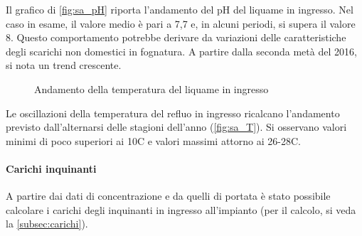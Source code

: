 Il grafico di \autoref{fig:sa_pH} riporta l’andamento del pH del liquame in ingresso.
Nel caso in esame, il valore medio è pari a 7,7 e, in alcuni periodi, si supera il valore 8. Questo comportamento potrebbe derivare da variazioni delle caratteristiche degli scarichi non domestici in fognatura. A partire dalla seconda metà del 2016, si nota un trend crescente.

\begin{figure}
	\fbox{\texttt{[image: sa\_T]}}
	\centering
	\caption{Andamento della temperatura del liquame in ingresso}
	\label{fig:sa_T}
\end{figure}

Le oscillazioni della temperatura del refluo in ingresso ricalcano l’andamento previsto dall’alternarsi delle stagioni dell’anno (\autoref{fig:sa_T}).
Si osservano valori minimi di poco superiori ai 10\textdegree C e valori massimi attorno ai 26-28\textdegree C.

\paragraph{Carichi inquinanti}

A partire dai dati di concentrazione e da quelli di portata è stato possibile calcolare i carichi degli inquinanti in ingresso all'impianto (per il calcolo, si veda la \autoref{subsec:carichi}).

